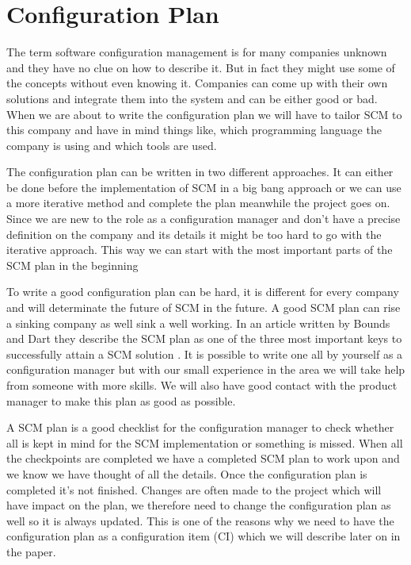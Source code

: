 \documentclass[a4paper,10pt]{article}
\begin{document}
\section{Configuration Plan}


The term software configuration management is for many companies unknown and they have no clue on how to describe it.
But in fact they might use some of the concepts without even knowing it.
Companies can come up with their own solutions and integrate them into the system and can be either good or bad.
When we are about to write the configuration plan we will have to tailor SCM to this company and have in mind things like, which programming language the company is using and which tools are used.

The configuration plan can be written in two different approaches. \cite{SCMPLAN} It can either be done before the implementation of SCM in a big bang approach or we can use a more iterative method and complete the plan meanwhile the project goes on. 
Since we are new to the role as a configuration manager and don’t have a precise definition on the company and its details it might be too hard to go with the iterative approach.
This way we can start with the most important parts of the SCM plan in the beginning

To write a good configuration plan can be hard, it is different for every company and will determinate the future of SCM in the future.
A good SCM plan can rise a sinking company as well sink a well working.
In an article written by Bounds and Dart they describe the SCM plan as one of the three most important keys to successfully attain a SCM solution \cite{BoundsDart}.
It is possible to write one all by yourself as a configuration manager but with our small experience in the area we will take help from someone with more skills.
We will also have good contact with the product manager to make this plan as good as possible.

A SCM plan is a good checklist for the configuration manager to check whether all is kept in mind for the SCM implementation or something is missed. When all the checkpoints are completed we have a completed SCM plan to work upon and we know we have thought of all the details. Once the configuration plan is completed it’s not finished. Changes are often made to the project which will have impact on the plan, we therefore need to change the configuration plan as well so it is always updated. This is one of the reasons why we need to have the configuration plan as a configuration item (CI) which we will describe later on in the paper.
\end{document}

